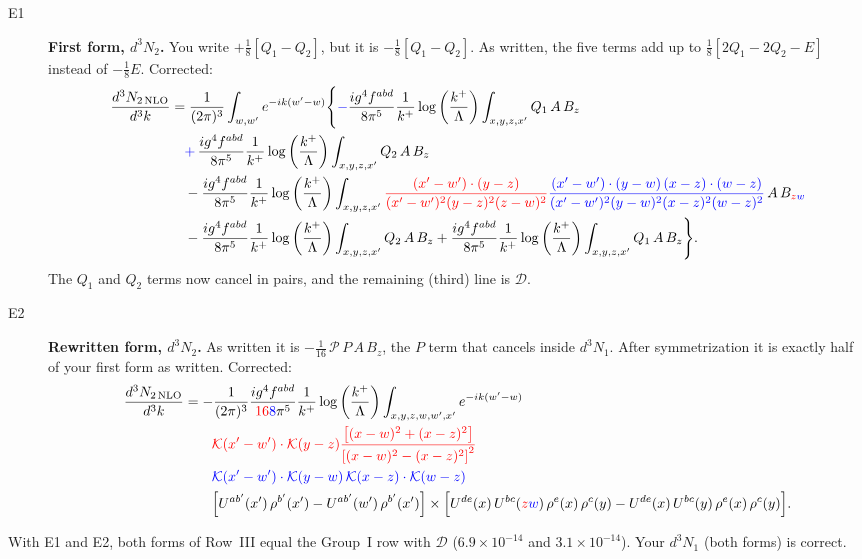 \documentclass[10pt]{article}
\numberwithin{equation}{section}
\newcommand{\new}[1]{{\color{blue}#1}}
\newcommand{\old}[1]{{\color{red}#1}}
\newcommand{\LK}{\log{\left(\frac{k^{+}}{\Lambda}\right)}}
\newcommand{\AX}{\Big[U^{ab'}(x')\,\rho^{b'}(x')-U^{ab'}(w')\,\rho^{b'}(x')\Big]}
\newcommand{\BZ}[1]{\Big[U^{de}(x)\,U^{bc}(#1)\,\rho^{e}(x)\,\rho^{c}(y)-U^{de}(x)\,U^{bc}(y)\,\rho^{e}(x)\,\rho^{c}(y)\Big]}
\begin{document}
\begin{description}
\item[E1] \textbf{First form, $d^3N_2$.} You write $+\tfrac18[Q_1-Q_2]$, but it is $-\tfrac18[Q_1-Q_2]$. As written, the five terms add up to $\tfrac18[2Q_1-2Q_2-E]$ instead of $-\tfrac18E$. Corrected:
\begin{align}
\frac{d^{3}N_{2\,\rm NLO}}{d^{3}k}&=\frac{1}{(2\pi)^{3}}\int_{w,w'}e^{-ik(w'-w)}\Bigg\{\new{-}\frac{ig^{4}f^{abd}}{8\pi^{5}}\frac{1}{k^{+}}\LK\int_{x,y,z,x'}Q_1\,A\,B_z\notag\\&\quad\new{+}\,\frac{ig^{4}f^{abd}}{8\pi^{5}}\frac{1}{k^{+}}\LK\int_{x,y,z,x'}Q_2\,A\,B_z\notag\\
&\quad-\frac{ig^{4}f^{abd}}{8\pi^{5}}\frac{1}{k^{+}}\LK\int_{x,y,z,x'}\old{\frac{(x'-w')\cdot(y-z)}{(x'-w')^{2}(y-z)^{2}(z-w)^{2}}}\new{\frac{(x'-w')\cdot(y-w)\,(x-z)\cdot(w-z)}{(x'-w')^{2}(y-w)^{2}(x-z)^{2}(w-z)^{2}}}\,A\,B_{\old{z}\new{w}}\notag\\
&\quad-\frac{ig^{4}f^{abd}}{8\pi^{5}}\frac{1}{k^{+}}\LK\int_{x,y,z,x'}Q_2\,A\,B_z+\frac{ig^{4}f^{abd}}{8\pi^{5}}\frac{1}{k^{+}}\LK\int_{x,y,z,x'}Q_1\,A\,B_z\Bigg\}.
\end{align}
The $Q_1$ and $Q_2$ terms now cancel in pairs, and the remaining (third) line is $\mathcal D$.
\item[E2] \textbf{Rewritten form, $d^3N_2$.} As written it is $-\tfrac1{16}\,\mathcal P\,P\,A\,B_z$, the $P$ term that cancels inside $d^3N_1$. After symmetrization it is exactly half of your first form as written. Corrected:
\begin{align}
\frac{d^{3}N_{2\,\rm NLO}}{d^{3}k}&=-\frac{1}{(2\pi)^{3}}\frac{ig^{4}f^{abd}}{\old{16}\new{8}\pi^{5}}\frac{1}{k^{+}}\LK\int_{x,y,z,w,w',x'}e^{-ik(w'-w)}\notag\\&\qquad\old{\mathcal K(x'-w')\cdot\mathcal K(y-z)\frac{\left[(x-w)^{2}+(x-z)^{2}\right]}{\left[(x-w)^{2}-(x-z)^{2}\right]^{2}}}\notag\\
&\qquad\new{\mathcal K(x'-w')\cdot\mathcal K(y-w)\,\mathcal K(x-z)\cdot\mathcal K(w-z)}\notag\\&\qquad\AX\times\BZ{\old{z}\new{w}}.
\end{align}
\end{description}
With E1 and E2, both forms of Row~III equal the Group~I row with $\mathcal D$ ($6.9\times10^{-14}$ and $3.1\times10^{-14}$). Your $d^3N_1$ (both forms) is correct.
\end{document}
